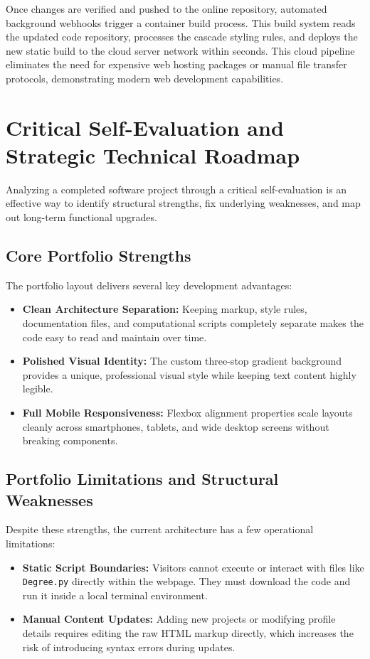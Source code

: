 \documentclass[12pt,a4paper]{article}
\begin{document}
Once changes are verified and pushed to the online repository, automated background webhooks trigger a container build process. This build system reads the updated code repository, processes the cascade styling rules, and deploys the new static build to the cloud server network within seconds. This cloud pipeline eliminates the need for expensive web hosting packages or manual file transfer protocols, demonstrating modern web development capabilities.

\section{Critical Self-Evaluation and Strategic Technical Roadmap}
Analyzing a completed software project through a critical self-evaluation is an effective way to identify structural strengths, fix underlying weaknesses, and map out long-term functional upgrades.

\subsection{Core Portfolio Strengths}
The portfolio layout delivers several key development advantages:
\begin{itemize}
    \item \textbf{Clean Architecture Separation:} Keeping markup, style rules, documentation files, and computational scripts completely separate makes the code easy to read and maintain over time.
    \item \textbf{Polished Visual Identity:} The custom three-stop gradient background provides a unique, professional visual style while keeping text content highly legible.
    \item \textbf{Full Mobile Responsiveness:} Flexbox alignment properties scale layouts cleanly across smartphones, tablets, and wide desktop screens without breaking components.
\end{itemize}

\subsection{Portfolio Limitations and Structural Weaknesses}
Despite these strengths, the current architecture has a few operational limitations:
\begin{itemize}
    \item \textbf{Static Script Boundaries:} Visitors cannot execute or interact with files like \texttt{Degree.py} directly within the webpage. They must download the code and run it inside a local terminal environment.
    \item \textbf{Manual Content Updates:} Adding new projects or modifying profile details requires editing the raw HTML markup directly, which increases the risk of introducing syntax errors during updates.
\end{itemize}
\end{document}
